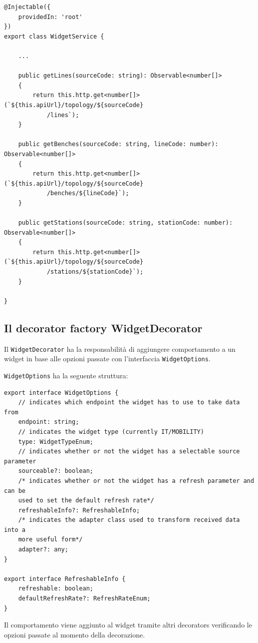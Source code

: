 \begin{lstlisting}[caption={Metodi per recuperare linee, banchi e stazioni all'interno della classe WidgetService}, style=javaScriptCode]
@Injectable({
    providedIn: 'root'
})
export class WidgetService {

    ...
        
    public getLines(sourceCode: string): Observable<number[]> 
    {
        return this.http.get<number[]>(`${this.apiUrl}/topology/${sourceCode}
            /lines`);
    }

    public getBenches(sourceCode: string, lineCode: number): Observable<number[]> 
    {
        return this.http.get<number[]>(`${this.apiUrl}/topology/${sourceCode}
            /benches/${lineCode}`);
    }

    public getStations(sourceCode: string, stationCode: number): Observable<number[]> 
    {
        return this.http.get<number[]>(`${this.apiUrl}/topology/${sourceCode}
            /stations/${stationCode}`);
    }

}
\end{lstlisting}

\subsection{Il decorator factory WidgetDecorator}
\label{subsec:widgetDecorator}
Il \verb|WidgetDecorator| ha la responsabilità di aggiungere comportamento a un widget in base alle opzioni passate con l'interfaccia \verb|WidgetOptions|.

\verb|WidgetOptions| ha la seguente struttura:

\begin{lstlisting}[caption={Struttura delle WidgetOptions e delle RefreshableInfo}, style=javaScriptCode]
export interface WidgetOptions {
    // indicates which endpoint the widget has to use to take data from
    endpoint: string;
    // indicates the widget type (currently IT/MOBILITY)
    type: WidgetTypeEnum;
    // indicates whether or not the widget has a selectable source parameter
    sourceable?: boolean;
    /* indicates whether or not the widget has a refresh parameter and can be 
    used to set the default refresh rate*/
    refreshableInfo?: RefreshableInfo; 
    /* indicates the adapter class used to transform received data into a 
    more useful form*/
    adapter?: any;
}

export interface RefreshableInfo {
    refreshable: boolean;
    defaultRefreshRate?: RefreshRateEnum;
}
\end{lstlisting}
Il comportamento viene aggiunto al widget tramite altri decorators verificando le opzioni passate al momento della decorazione.

